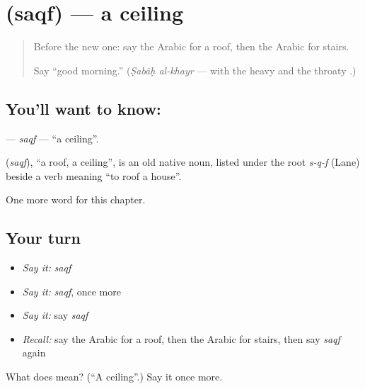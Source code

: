 \section[\texorpdfstring{\ar{سقف} (saqf)}{سقف (saqf)}]{ (saqf) — a ceiling}

\label{lesson:AR-C102-saqf}



\begin{quote}
Before the new one: say the Arabic for a roof, then the Arabic for stairs.

Say \textquotedblleft{}good morning.\textquotedblright{} (\emph{Ṣabāḥ al-khayr} — with the heavy \textbf{} and the throaty \textbf{}.)
\end{quote}

\subsection*{You'll want to know: }
\textbf{} — \emph{saqf} — \textquotedblleft{}a ceiling\textquotedblright{}.

\begin{cousinweb}
\textbf{} (\emph{saqf}), \textquotedblleft{}a roof, a ceiling\textquotedblright{}, is an old native noun, listed under the root \emph{s-q-f} (Lane) beside a verb meaning \textquotedblleft{}to roof a house\textquotedblright{}.
\end{cousinweb}

\begin{grammarlens}[title={What you've built}]
One more word for this chapter.
\end{grammarlens}

\subsection*{Your turn}
\begin{itemize}
\raggedright
  \item \emph{Say it:} \emph{saqf}
  \item \emph{Say it:} \emph{saqf}, once more
  \item \emph{Say it:} say \emph{saqf}
  \item \emph{Recall:} say the Arabic for a roof, then the Arabic for stairs, then say \emph{saqf} again
\end{itemize}

\begin{tcolorbox}[breakable,colback=teal!4,colframe=teal!35!black,title={Before you move on}]
What does  mean? (\textquotedblleft{}A ceiling\textquotedblright{}.) Say it once more.
\end{tcolorbox}
